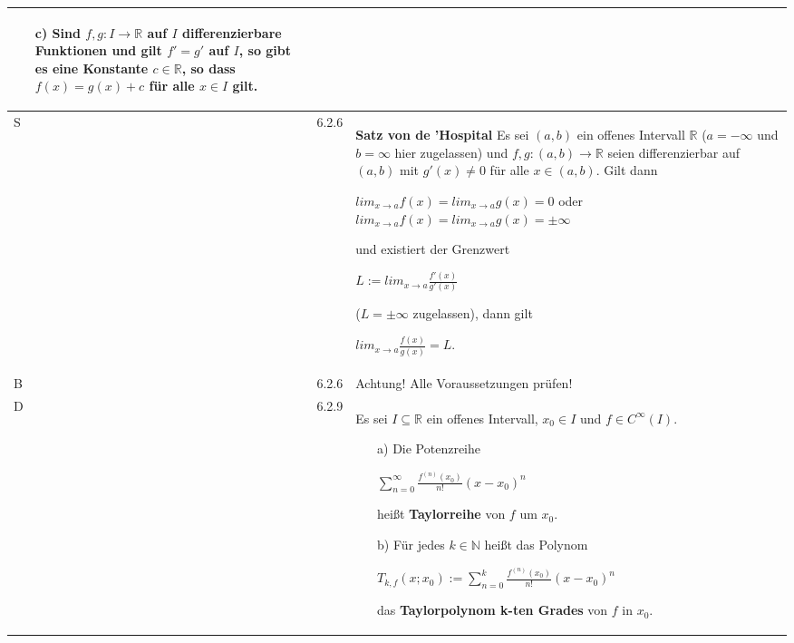 \begin{longtable}{p{0.75cm} p{1cm} p{16cm}}
\begin{itemize}[topsep=-0.5cm]
\begin{itemize}[topsep=-0.5cm]
                                        \end{itemize}
                            \item[c)] Sind $f,g : I \rightarrow \mathbb{R}$ auf $I$ differenzierbare Funktionen und gilt $f' = g'$ auf $I$,
                                        so gibt es eine Konstante $c \in \mathbb{R}$, so dass $f(x) = g(x) + c$ für alle $x \in I$ gilt.
                        \end{itemize} \vspace{-0cm} \\
        \midrule
        S   & 6.2.6 &   \textbf{Satz von de 'Hospital} \hfill \break
                        Es sei $(a,b)$ ein offenes Intervall $\mathbb{R}$ ($a= - \infty$ und $b = \infty$ hier zugelassen)  und $f,g:
                        (a,b) \rightarrow \mathbb{R}$ seien differenzierbar auf $(a,b)$ mit $g'(x) \neq 0$ für alle $x \in (a,b)$. Gilt dann
                        \hfill \break
                        \centerline{$lim_{x \rightarrow a} f(x) = lim_{x \rightarrow a} g(x) = 0$ oder $lim_{x \rightarrow a} f(x) = 
                        lim_{x \rightarrow a} g(x) = \pm \infty$} 
                        und existiert der Grenzwert \hfill \break
                        \centerline{$ L := lim_{x \rightarrow a} \frac{f'(x)}{g'(x)} $} 
                        ($L = \pm \infty$ zugelassen), dann gilt \hfill \break
                        \centerline{$lim_{x \rightarrow a} \frac{f(x)}{g(x)} = L$.}\\
        \midrule
        B   & 6.2.6 &   Achtung! Alle Voraussetzungen prüfen! \\
        \midrule
        D   & 6.2.9 &   Es sei $I \subseteq \mathbb{R}$ ein offenes Intervall, $x_0 \in I$ und $f \in C^{\infty}(I)$.
                        \begin{itemize}[topsep=-0.5cm]
                            \item[a)] Die Potenzreihe \hfill \break
                                        \centerline{$\sum^{\infty}_{n=0} \frac{f^{(n)}(x_0)}{n!}(x-x_0)^n$}
                                        heißt \textbf{Taylorreihe} von $f$ um $x_0$.
                            \item[b)] Für jedes $k \in \mathbb{N}$ heißt das Polynom \hfill \break
                                        \centerline{$T_{k,f}(x;x_0) := \sum^{k}_{n=0} \frac{f^{(n)}(x_0)}{n!}(x-x_0)^n$}
                                        das \textbf{Taylorpolynom k-ten Grades} von $f$ in $x_0$.
                        \end{itemize} \vspace{-0cm}  \\

\end{longtable}
